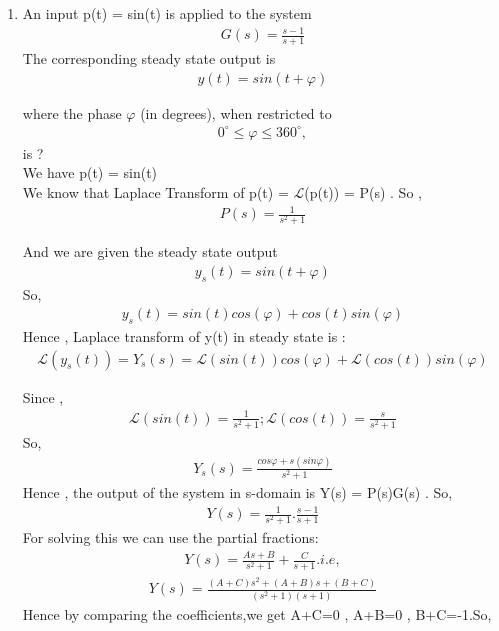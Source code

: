 \begin{enumerate}[label=\thesection.\arabic*.,ref=\thesection.\theenumi]
\item 
An input p(t) = sin(t) is applied to the system 
\begin{align}
G(s) = \frac{s-1}{s+1} 
\end{align}
The corresponding steady state output is \begin{align}
y(t) = sin(t + \varphi)
\end{align}

where the phase $\varphi$ (in degrees), when restricted to 
\begin{align}
0^{\circ} \leq \varphi \leq 360^{\circ},
\end{align}
is ? \\



\solution
We have p(t) = sin(t)
 \\
 
We know that Laplace Transform of p(t) = $\mathcal{L}$(p(t)) = P(s) . So , 
\begin{align}
P(s) = \frac{1}{s^2 + 1}
\end{align}

And we are given the steady state output
\begin{align}
y_s(t) = sin(t+\varphi)
\end{align}
So,
\begin{align}
y_s(t) = sin(t)cos(\varphi) + cos(t)sin(\varphi)
\end{align}
Hence , Laplace transform of y(t) in steady state is :
\begin{align}
\mathcal{L}(y_s(t))  =Y_s(s) = \mathcal{L}(sin(t))cos(\varphi) + \mathcal{L}(cos(t))sin(\varphi)
\end{align}

Since ,
\begin{align}
 \mathcal{L}(sin(t)) = \frac{1}{s^2 + 1} ; \mathcal{L}(cos(t)) = \frac{s}{s^2 + 1}
\end{align}
So,
\begin{align}
Y_s(s) = \frac{cos\varphi + s(sin\varphi)}{s^2 + 1} 
\end{align}
Hence , the output of the system in s-domain is Y(s) = P(s)G(s) . So,
\begin{align}
Y(s) = \frac{1}{s^2 + 1} . \frac{s-1}{s+1}
\end{align}
For solving this we can use the partial fractions:
\begin{align}
Y(s) = \frac{As + B}{s^2 + 1}+\frac{C}{s + 1}.i.e,
\end{align}
\begin{align}
Y(s)=\frac{(A+C)s^2+(A+B)s+(B+C)}{(s^2 + 1)(s + 1)}  
\end{align}
Hence by comparing the coefficients,we get A+C=0 , A+B=0 , B+C=-1.So,


\end{enumerate}
